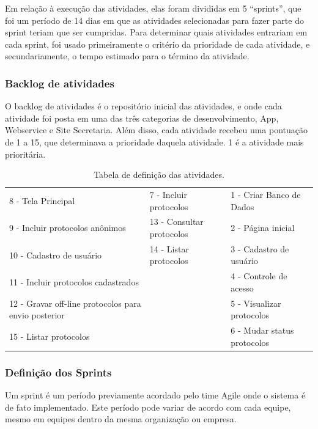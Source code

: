 \documentclass[
	article,			%
	11pt,				%
	oneside,			%
	a4paper,			%
	english,			%
	brazil,				%
	sumario=tradicional
	]{abntex2}
\begin{document}
Em relação à execução das atividades, elas foram divididas em 5 “sprints”, que foi um período de 14 dias em que as atividades selecionadas para fazer parte do sprint teriam que ser cumpridas.
Para determinar quais atividades entrariam em cada sprint, foi usado primeiramente o critério da prioridade de cada atividade, e secundariamente, o tempo estimado para o término da atividade.

\subsubsection{Backlog de atividades}

O backlog de atividades é o repositório inicial das atividades, e onde cada atividade foi posta em uma das três categorias de desenvolvimento, App, Webservice e Site Secretaria.
Além disso, cada atividade recebeu uma pontuação de 1 a 15, que determinava a prioridade daquela atividade. 1 é a atividade mais prioritária.

\begin{table}[htbp]
    \caption{Tabela de definição das atividades.}
    \label{tabela-atividades}
    \begin{center}
        \begin{tabular}{|p{5cm}|p{4cm}|p{5cm}|}
            \hline
            8 - Tela Principal & 7 - Incluir protocolos & 1 - Criar Banco de Dados \\
            9 - Incluir protocolos anônimos & 13 - Consultar protocolos & 2 - Página inicial \\
            10 - Cadastro de usuário & 14 - Listar protocolos & 3 - Cadastro de usuário \\
            11 - Incluir protocolos cadastrados & & 4 - Controle de acesso \\
            12 - Gravar off-line protocolos para envio posterior & & 5 - Visualizar protocolos \\
            15 - Listar protocolos & & 6 - Mudar status protocolos \\
            \hline
        \end{tabular}
    \end{center}
\end{table}

\subsubsection{Definição dos Sprints}

Um sprint é um período previamente acordado pelo time Agile onde o sistema é de fato implementado.
Este período pode variar de acordo com cada equipe, mesmo em equipes dentro da mesma organização ou empresa.
\end{document}
